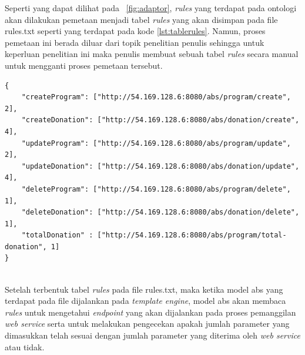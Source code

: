 Seperti yang dapat dilihat pada \pic~\ref{fig:adaptor}, \textit{rules} yang terdapat pada ontologi akan dilakukan pemetaan menjadi tabel \textit{rules} yang akan disimpan pada file rules.txt seperti yang terdapat pada kode \ref{lst:tablerules}. Namun, proses pemetaan ini berada diluar dari topik penelitian penulis sehingga untuk keperluan penelitian ini maka penulis membuat sebuah tabel \textit{rules} secara manual untuk mengganti proses pemetaan tersebut.

\begin{minipage}{\linewidth}
\begin{lstlisting}[caption={Contoh tabel \textit{rules}},label={lst:tablerules}]
{
	"createProgram": ["http://54.169.128.6:8080/abs/program/create", 2],
	"createDonation": ["http://54.169.128.6:8080/abs/donation/create", 4],
	"updateProgram": ["http://54.169.128.6:8080/abs/program/update", 2],
	"updateDonation": ["http://54.169.128.6:8080/abs/donation/update", 4],
	"deleteProgram": ["http://54.169.128.6:8080/abs/program/delete", 1],
	"deleteDonation": ["http://54.169.128.6:8080/abs/donation/delete", 1],
	"totalDonation" : ["http://54.169.128.6:8080/abs/program/total-donation", 1]
}
\end{lstlisting}
\end{minipage} \\

Setelah terbentuk tabel \textit{rules} pada file rules.txt, maka ketika model abs yang terdapat pada file dijalankan pada \textit{template engine}, model abs akan membaca \textit{rules} untuk mengetahui \textit{endpoint} yang akan dijalankan pada proses pemanggilan \textit{web service} serta untuk melakukan pengecekan apakah jumlah parameter yang dimasukkan telah sesuai dengan jumlah parameter yang diterima oleh \textit{web service} atau tidak.